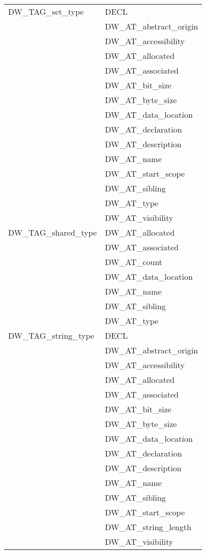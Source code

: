 \begin{longtable}{l|p{8cm}}
DW\_TAG\_set\_type
&DECL  \\
&DW\_AT\_abstract\_origin  \\
&DW\_AT\_accessibility  \\
&DW\_AT\_allocated  \\
&DW\_AT\_associated  \\
&DW\_AT\_bit\_size  \\
&DW\_AT\_byte\_size  \\
&DW\_AT\_data\_location  \\
&DW\_AT\_declaration  \\
&DW\_AT\_description  \\
&DW\_AT\_name  \\
&DW\_AT\_start\_scope  \\
&DW\_AT\_sibling  \\
&DW\_AT\_type  \\
&DW\_AT\_visibility  \\

DW\_TAG\_shared\_type
&DW\_AT\_allocated  \\
&DW\_AT\_associated  \\
&DW\_AT\_count  \\
&DW\_AT\_data\_location  \\
&DW\_AT\_name  \\
&DW\_AT\_sibling  \\
&DW\_AT\_type  \\


DW\_TAG\_string\_type
&DECL  \\
&DW\_AT\_abstract\_origin  \\
&DW\_AT\_accessibility  \\
&DW\_AT\_allocated  \\
&DW\_AT\_associated  \\
&DW\_AT\_bit\_size  \\
&DW\_AT\_byte\_size  \\
&DW\_AT\_data\_location  \\
&DW\_AT\_declaration  \\
&DW\_AT\_description  \\
&DW\_AT\_name  \\
&DW\_AT\_sibling  \\
&DW\_AT\_start\_scope  \\
&DW\_AT\_string\_length  \\
&DW\_AT\_visibility  \\


\end{longtable}
